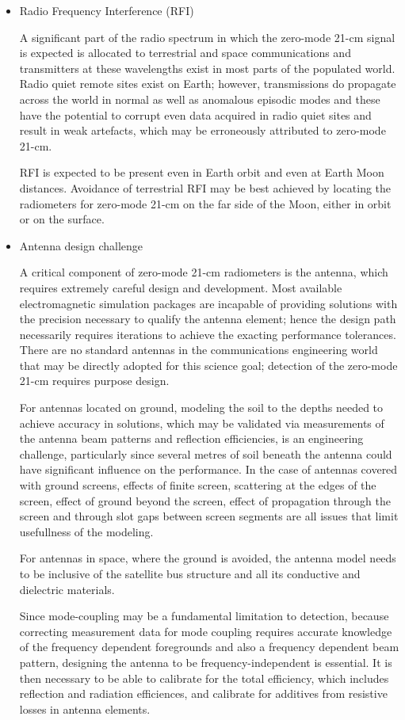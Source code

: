 \begin{itemize}
\item
Radio Frequency Interference (RFI)

A significant part of the radio spectrum in which the zero-mode 21-cm signal is expected is allocated to terrestrial and space communications and transmitters at these wavelengths exist in most parts of the populated world.  Radio quiet remote sites exist on Earth; however, transmissions do propagate across the world in normal as well as anomalous episodic modes and these have the potential to corrupt even data acquired in radio quiet sites and result in weak artefacts, which may be erroneously attributed to zero-mode 21-cm.  

RFI is expected to be present even in Earth orbit and even at Earth Moon distances.  Avoidance of terrestrial RFI may be best achieved by locating the radiometers for zero-mode 21-cm on the far side of the Moon, either in orbit or on the surface.

\item
Antenna design challenge

A critical component of zero-mode 21-cm radiometers is the antenna, which requires extremely careful design and development. Most available electromagnetic simulation packages are incapable of providing solutions with the precision necessary to qualify the antenna element; hence the design path necessarily requires iterations to achieve the exacting performance tolerances.  There are no standard antennas in the communications engineering world that may be directly adopted for this science goal; detection of the zero-mode 21-cm requires purpose design.  

For antennas located on ground, modeling the soil to the depths needed to achieve accuracy in solutions, which may be validated via measurements of the antenna beam patterns and reflection efficiencies, is an engineering challenge, particularly since several metres of soil beneath the antenna could have significant influence on the performance.  In the case of antennas covered with ground screens, effects of finite screen, scattering at the edges of the screen,  effect of ground beyond the screen, effect of propagation through the screen and through slot gaps between screen segments are all issues that limit usefullness of the modeling.

For antennas in space, where the ground is avoided, the antenna model needs to be inclusive of the satellite bus structure and all its conductive and dielectric materials.

Since mode-coupling may be a fundamental limitation to detection, because correcting measurement data for mode coupling requires accurate knowledge of the frequency dependent foregrounds and also a frequency dependent beam pattern, designing the antenna to be frequency-independent is essential.  It is then necessary to be able to calibrate for the total efficiency, which includes reflection and radiation efficiences, and calibrate for additives from resistive losses in antenna elements.


\end{itemize}
